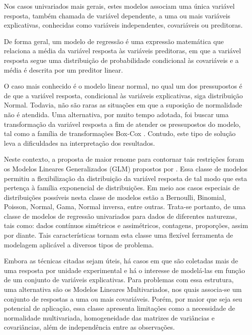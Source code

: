 Nos casos univariados mais gerais, estes modelos associam uma única variável resposta, também chamada de variável dependente, a uma ou mais variáveis explicativas, conhecidas como variáveis independentes, covariáveis ou preditoras. 

De forma geral, um modelo de regressão é uma expressão matemática que relaciona a média da variável resposta às variáveis preditoras, em que a variável resposta segue uma distribuição de probabilidade condicional às covariáveis e a média é descrita por um preditor linear. 

O caso mais conhecido é o modelo linear normal, no qual um dos pressupostos é de que a variável resposta, condicional às variáveis explicativas, siga distribuição Normal. Todavia, não são raras as situações em que a suposição de normalidade não é atendida. Uma alternativa, por muito tempo adotada, foi buscar uma transformação da variável resposta a fim de atender os pressupostos do modelo, tal como a família de transformações Box-Cox \citep{boxcox64}. Contudo, este tipo de solução leva a dificuldades na interpretação dos resultados.

Neste contexto, a proposta de maior renome para contornar tais restrições foram os Modelos Lineares Generalizados (GLM) propostos por \citet{Nelder72}. Essa classe de modelos permitiu a flexibilização da distribuição da variável resposta de tal modo que esta pertença à família exponencial de distribuições. Em meio aos casos especiais de distribuições possíveis nesta classe de modelos estão a Bernoulli, Binomial, Poisson, Normal, Gama, Normal inversa, entre outras. Trata-se portanto, de uma classe de modelos de regressão univariados para dados de diferentes naturezas, tais como: dados contínuos simétricos e assimétricos, contagens, proporções, assim por diante. Tais características tornam esta classe uma flexível ferramenta de modelagem aplicável a diversos tipos de problema.

Embora as técnicas citadas sejam úteis, há casos em que são coletadas mais de uma resposta por unidade experimental e há o interesse de modelá-las em função de um conjunto de variáveis explicativas. Para problemas com essa estrutura, uma alternativa são os Modelos Lineares Multivariados, nos quais associa-se um conjunto de respostas a uma ou mais covariáveis. Porém, por maior que seja seu potencial de aplicação, essa classe apresenta limitações como a necessidade de normalidade multivariada, homogeneidade das matrizes de variâncias e covariâncias, além de independência entre as observações.

